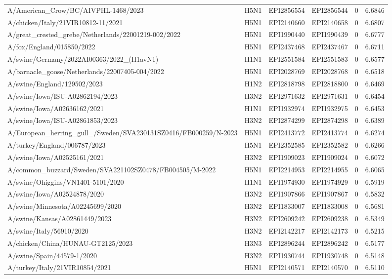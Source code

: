 \begin{tabular}{L{1.95in}|L{.25in}|L{.60in}|L{.6in}|C{1in}|C{1in}}
A/American\_Crow/BC/AIVPHL-1468/2023&H5N1&EPI2856554&EPI2856544&0&6.6846\\
A/chicken/Italy/21VIR10812-11/2021&H5N1&EPI2140660&EPI2140658&0&6.6807\\
A/great\_crested\_grebe/Netherlands/22001219-002/2022&H5N1&EPI1990440&EPI1990439&0&6.6777\\
A/fox/England/015850/2022&H5N1&EPI2437468&EPI2437467&0&6.6711\\
A/swine/Germany/2022AI00363/2022\_(H1avN1)&H1N1&EPI2551584&EPI2551583&0&6.6577\\
A/barnacle\_goose/Netherlands/22007405-004/2022&H5N1&EPI2028769&EPI2028768&0&6.6518\\
A/swine/England/129502/2023&H1N2&EPI2818798&EPI2818800&0&6.6469\\
A/swine/Iowa/ISU-A02862194/2023&H3N2&EPI2971632&EPI2971631&0&6.6454\\
A/swine/Iowa/A02636162/2021&H1N1&EPI1932974&EPI1932975&0&6.6453\\
A/swine/Iowa/ISU-A02861853/2023&H3N2&EPI2874299&EPI2874298&0&6.6389\\
A/European\_herring\_gull\_/Sweden/SVA230131SZ0416/FB000259/N-2023&H5N1&EPI2413772&EPI2413774&0&6.6274\\
A/turkey/England/006787/2023&H5N1&EPI2352585&EPI2352582&0&6.6266\\
A/swine/Iowa/A02525161/2021&H3N2&EPI1909023&EPI1909024&0&6.6072\\
A/common\_buzzard/Sweden/SVA221102SZ0478/FB004505/M-2022&H5N1&EPI2214953&EPI2214955&0&6.6065\\
A/swine/Ohiggins/VN1401-5101/2020&H1N1&EPI1974930&EPI1974929&0&6.5919\\
A/swine/Iowa/A02524878/2020&H3N2&EPI1907866&EPI1907867&0&6.5832\\
A/swine/Minnesota/A02245699/2020&H3N2&EPI1833007&EPI1833008&0&6.5681\\
A/swine/Kansas/A02861449/2023&H3N2&EPI2609242&EPI2609238&0&6.5349\\
A/swine/Italy/56910/2020&H3N2&EPI2142217&EPI2142173&0&6.5215\\
A/chicken/China/HUNAU-GT2125/2023&H3N3&EPI2896244&EPI2896242&0&6.5177\\
A/swine/Spain/44579-1/2020&H3N2&EPI1930744&EPI1930748&0&6.5148\\
A/turkey/Italy/21VIR10854/2021&H5N1&EPI2140571&EPI2140570&0&6.5110\\
\hline\end{tabular}
